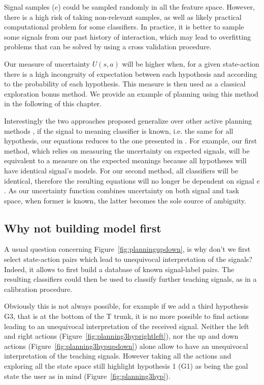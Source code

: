 Signal samples ($e$) could be sampled randomly in all the feature space. However, there is a high risk of taking non-relevant samples, as well as likely practical computational problem for some classifiers. In practice, it is better to sample some signals from our past history of interaction, which may lead to overfitting problems that can be solved by using a cross validation procedure.

Our measure of uncertainty $U(s,a)$ will be higher when, for a given state-action there is a high incongruity of expectation between each hypothesis and according to the probability of each hypothesis. This measure is then used as a classical exploration bonus method. We provide an example of planning using this method in the following of this chapter.

\transition

Interestingly the two approaches proposed generalize over other active planning methods \cite{macl09airl}, if the signal to meaning classifier is known, i.e. the same for all hypothesis, our equations reduces to the one presented in \cite{macl11simul}. For example, our first method, which relies on measuring the uncertainty on expected signals, will be equivalent to a measure on the expected meanings because all hypotheses will have identical signal's models. For our second method, all classifiers will be identical, therefore the resulting equations will no longer be dependent on signal $e$. As our uncertainty function combines uncertainty on both signal and task space, when former is known, the latter becomes the sole source of ambiguity.

\subsection{Why not building model first}

A usual question concerning Figure~\ref{fig:planningupdown}, is why don't we first select state-action pairs which lead to unequivocal interpretation of the signals? Indeed, it allows  to first build a database of known signal-label pairs. The resulting classifiers could then be used to classify further teaching signals, as in a calibration procedure.

Obviously this is not always possible, for example if we add a third hypothesis G3, that is at the bottom of the T trunk, it is no more possible to find actions leading to an unequivocal interpretation of the received signal. Neither the left and right actions (Figure~\ref{fig:planning3hyprightleft}), nor the up and down actions (Figure~\ref{fig:planning3hypupdown}) alone allow to have an unequivocal interpretation of the teaching signals. However taking all the actions and exploring all the state space still highlight hypothesis 1 (G1) as being the goal state the user as in mind (Figure~\ref{fig:planning3hyp}).

